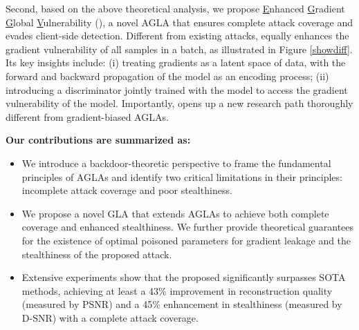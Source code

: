 
Second, based on the above theoretical analysis, we propose \underline{E}nhanced \underline{G}radient \underline{G}lobal \underline{V}ulnerability (\name), a novel AGLA that ensures complete attack coverage and evades client-side detection. 
Different from existing attacks, \name equally enhances the gradient vulnerability of all samples in a batch, as illustrated in Figure \ref{showdiff}. Its key insights include: (i) treating gradients as a latent space of data, with the forward and backward propagation of the model as an encoding process; (ii) introducing a discriminator jointly trained with the model to access the gradient vulnerability of the model. Importantly, \name opens up a new research path thoroughly different from gradient-biased AGLAs.

\textbf{Our contributions are summarized as:} 
\begin{itemize}

\item We introduce a backdoor-theoretic perspective to frame the fundamental principles of AGLAs and identify two critical limitations in their principles: incomplete attack coverage and poor stealthiness.

\item We propose a novel GLA \name that extends AGLAs to achieve both complete coverage and enhanced stealthiness. We further provide theoretical guarantees for the existence of optimal poisoned parameters for gradient leakage and the stealthiness of the proposed attack.

\item Extensive experiments show that the proposed \name significantly surpasses SOTA methods, achieving at least a 43\% improvement in reconstruction quality (measured by PSNR) and a 45\% enhancement in stealthiness (measured by D-SNR) with a complete attack coverage.

\end{itemize}

